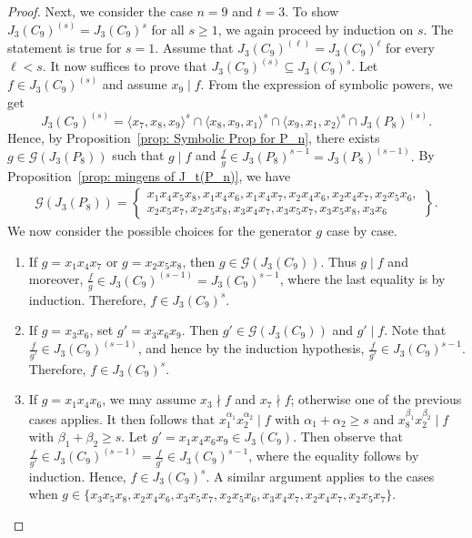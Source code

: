\documentclass[12pt]{amsart}
\def\l{\langle}
\def\r{\rangle}
\begin{document}
\begin{proof}
Next, we consider the case $n=9$ and $t=3$. To show $J_3(C_9)^{(s)} = J_3(C_9)^s$ for all $s \ge 1$, we again proceed by induction on $s$. The statement is true for $s=1$. Assume that $J_3(C_9)^{(\ell)} = J_3(C_9)^{\ell}$ for every $\ell<s$. It now suffices to prove that $J_3(C_9)^{(s)} \subseteq J_3(C_9)^s.$ Let $f\in J_3(C_9)^{(s)}$ and assume $x_9\mid f$. From the expression of symbolic powers, we get
\[
J_3(C_9)^{(s)} = \l x_7,x_8,x_9 \r ^s
\cap \l x_8,x_9,x_1 \r ^s
\cap \l x_9,x_1,x_2\r ^s
\cap J_3(P_8)^{(s)}.
\]
Hence, by Proposition~\ref{prop: Symbolic Prop for P_n}, there exists
$g\in \mathcal{G}(J_3(P_8))$ such that
$g\mid f$ and $\frac{f}{g}\in J_3(P_8)^{s-1}
=J_3(P_8)^{(s-1)}.$ By Proposition~\ref{prop: mingens of J_t(P_n)}, we have
\begin{align*}   
\mathcal{G}(J_3(P_8)) = \left\lbrace
\begin{array}{c}
    x_1x_4x_5x_8, x_1x_4x_6, x_1x_4x_7, x_2x_4x_6,x_2x_4x_7,x_2x_5x_6, \\ [1mm]
    x_2x_5x_7,x_2x_5x_8,x_3x_4x_7,x_3x_5x_7,x_3x_5x_8,x_3x_6
\end{array}
\right\rbrace .
\end{align*}
We now consider the possible choices for the generator $g$ case by case.

\begin{enumerate}

\item If $g=x_1x_4x_7$ or $g=x_2x_5x_8$, then
$g\in \mathcal{G}(J_3(C_9))$.
Thus $g\mid f$ and moreover,
$\frac{f}{g}\in J_3(C_9)^{(s-1)}=J_3(C_9)^{s-1}$, where the last equality is by induction. Therefore, $f\in J_3(C_9)^s$.

\item If $g=x_3x_6$, set $g'=x_3x_6x_9$.
Then $g'\in \mathcal{G}(J_3(C_9))$ and $g'\mid f$.
Note that $\frac{f}{g'}\in J_3(C_9)^{(s-1)}$, and hence by the induction hypothesis, $\frac{f}{g'}\in J_3(C_9)^{s-1}$. Therefore, $f\in J_3(C_9)^s$.

\item If $g=x_1x_4x_6$, we may assume
$x_3\nmid f$ and $x_7\nmid f$; otherwise one of the previous cases applies. It then follows that
$x_1^{\alpha_1}x_2^{\alpha_2}\mid f$ with $\alpha_1+\alpha_2\ge s$ and $x_8^{\beta_1}x_2^{\beta_2}\mid f$ with $\beta_1+\beta_2\ge s$. Let $g'=x_1x_4x_6x_9\in J_3(C_9)$. Then observe that $\frac{f}{g'}\in J_3(C_9)^{(s-1)}=\frac{f}{g'}\in J_3(C_9)^{s-1}$, where the equality follows by induction. Hence, $f\in J_3(C_9)^s$. A similar argument applies to the cases when  $g\in \{ x_3x_5x_8, x_2x_4x_6, x_3x_5x_7, x_2x_5x_6, x_3x_4x_7, x_2x_4x_7, x_2x_5x_7\}$.


\end{enumerate}
\end{proof}
\end{document}
